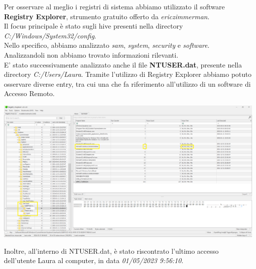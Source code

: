 Per osservare al meglio i registri di sistema abbiamo utilizzato il software \textbf{Registry Explorer}, strumento gratuito offerto da \textit{ericzimmerman}.\\
Il focus principale è stato sugli hive presenti nella directory \textit{C:/Windows/System32/config}.\\
Nello specifico, abbiamo analizzato \textit{sam}, \textit{system}, \textit{security} e \textit{software}. Analizzandoli non abbiamo trovato informazioni rilevanti.\vspace{14pt}\\
E' stato successivamente analizzato anche il file \textbf{NTUSER.dat}, presente nella directory \textit{C:/Users/Laura}. Tramite l'utilizzo di Registry Explorer abbiamo potuto osservare diverse entry, tra cui una che fa riferimento all'utilizzo di un software di Accesso Remoto.
\begin{center}
    \includegraphics[width=1\textwidth]{img/ntuser-remote.png}
\end{center}
Inoltre, all'interno di NTUSER.dat, è stato riscontrato l'ultimo accesso dell'utente Laura al computer, in data \textit{01/05/2023 9:56:10}.